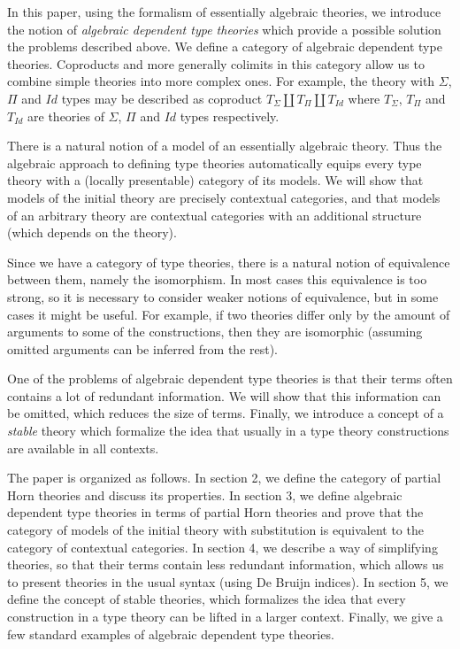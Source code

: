 \documentclass{elsarticle}
\theoremstyle{definition}
\theoremstyle{remark}
\numberwithin{figure}{section}
\begin{document}
In this paper, using the formalism of essentially algebraic theories, we introduce the notion of
\emph{algebraic dependent type theories} which provide a possible solution the problems described above.
We define a category of algebraic dependent type theories.
Coproducts and more generally colimits in this category allow us to combine simple theories into more complex ones.
For example, the theory with $\Sigma$, $\Pi$ and $Id$ types may be described as coproduct $T_\Sigma \amalg T_\Pi \amalg T_{Id}$
where $T_\Sigma$, $T_\Pi$ and $T_{Id}$ are theories of $\Sigma$, $\Pi$ and $Id$ types respectively.

There is a natural notion of a model of an essentially algebraic theory.
Thus the algebraic approach to defining type theories automatically equips every type theory with a (locally presentable) category of its models.
We will show that models of the initial theory are precisely contextual categories,
and that models of an arbitrary theory are contextual categories with an additional structure (which depends on the theory).

Since we have a category of type theories, there is a natural notion of equivalence between them, namely the isomorphism.
In most cases this equivalence is too strong, so it is necessary to consider weaker notions of equivalence, but in some cases it might be useful.
For example, if two theories differ only by the amount of arguments to some of the constructions,
then they are isomorphic (assuming omitted arguments can be inferred from the rest).

One of the problems of algebraic dependent type theories is that their terms often contains a lot of redundant information.
We will show that this information can be omitted, which reduces the size of terms.
Finally, we introduce a concept of a \emph{stable} theory which formalize the idea that usually in a type theory constructions are available in all contexts.

The paper is organized as follows.
In section 2, we define the category of partial Horn theories and discuss its properties.
In section 3, we define algebraic dependent type theories in terms of partial Horn theories and prove that the category of models of the initial theory with substitution is equivalent to the category of contextual categories.
In section 4, we describe a way of simplifying theories, so that their terms contain less redundant information,
    which allows us to present theories in the usual syntax (using De Bruijn indices).
In section 5, we define the concept of stable theories, which formalizes the idea that every construction in a type theory can be lifted in a larger context.
Finally, we give a few standard examples of algebraic dependent type theories.
\end{document}
